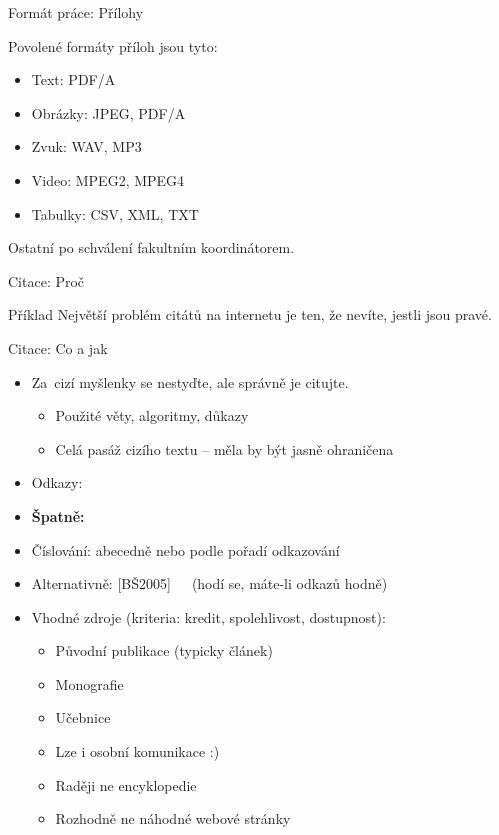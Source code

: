\documentclass{beamer}
\begin{document}
\begin{frame}{Formát práce: Přílohy}

Povolené formáty příloh jsou tyto:

\begin{itemize}
\item Text: PDF/A
\item Obrázky: JPEG, PDF/A
\item Zvuk: WAV, MP3
\item Video: MPEG2, MPEG4
\item Tabulky: CSV, XML, TXT
\end{itemize}

Ostatní po schválení fakultním koordinátorem.

\end{frame}

\begin{frame}{Citace: Proč}

\begin{block}{Příklad}
Největší problém citátů na internetu je ten,
že nevíte, jestli jsou pravé.

\end{block}

\end{frame}

\begin{frame}{Citace: Co a jak}

\begin{itemize}
\item Za~cizí myšlenky se nestyďte, ale správně je citujte.
   \begin{itemize}
   \item Použité věty, algoritmy, důkazy
   \item Celá pasáž cizího textu -- měla by být jasně ohraničena
   \end{itemize}
\item Odkazy: 
\item {\bf Špatně:} 
\item Číslování: abecedně nebo podle pořadí odkazování
\item Alternativně: [BŠ2005]~~~(hodí se, máte-li odkazů hodně)
\end{itemize}

\begin{itemize}
\item Vhodné zdroje (kriteria: kredit, spolehlivost, dostupnost):
   \begin{itemize}
   \item Původní publikace (typicky článek)
   \item Monografie
   \item Učebnice
   \item Lze i osobní komunikace :)
   \item Raději ne encyklopedie
   \item Rozhodně ne náhodné webové stránky
   \end{itemize}
\end{itemize}

\end{frame}
\end{document}
